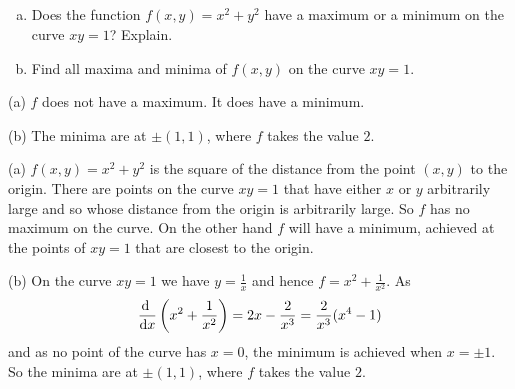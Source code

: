 


\subsection*{\Conceptual}

\begin{question}[M200 2010A] %
\begin{enumerate}[(a)]
\item
Does the function $f(x, y) = x^2 +y^2$ have a maximum or a minimum on the curve $xy = 1$?
Explain.
\item
Find all maxima and minima of $f(x, y)$ on the curve $xy = 1$.
\end{enumerate}
\end{question}

%

\begin{answer}
(a) $f$ does not have a maximum. It does have a minimum.

(b) The minima are at $\pm (1,1)$, where $f$ takes the value $2$.
\end{answer}
\begin{solution}
(a) 
$f(x, y) = x^2 +y^2$ is the square of the distance from the point $(x,y)$
to the origin. There are points on the curve $xy=1$ that have either $x$ or
$y$ arbitrarily large and so whose distance from the origin is arbitrarily
large. So $f$ has no maximum on the curve. On the other hand $f$ will have 
a minimum, achieved at the points of $xy=1$ that are closest to the origin.

(b) On the curve $xy=1$ we have $y=\frac{1}{x}$ and hence
$f=x^2+\frac{1}{x^2}$. As
\begin{align*}
\diff{}{x}\left(x^2+\frac{1}{x^2}\right)
=2x-\frac{2}{x^3}
=\frac{2}{x^3}(x^4-1)
\end{align*}
and as no point of the curve has $x=0$, the minimum is achieved when $x=\pm 1$. So the minima are at $\pm (1,1)$, where $f$ takes the value $2$.
\end{solution}

